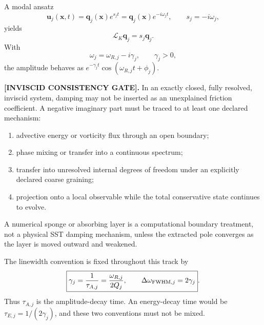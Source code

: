         A modal ansatz
        \begin{equation}
            \mathbf u_j(\mathbf x,t)
            =
            \mathbf q_j(\mathbf x)e^{s_jt}
            =
            \mathbf q_j(\mathbf x)e^{-i\omega_jt},
            \qquad
            s_j=-i\omega_j,
        \end{equation}
        yields
        \begin{equation}
            \mathcal L_K\mathbf q_j
            =
            s_j\mathbf q_j.
            \label{eq:rt_qss_eigenproblem}
        \end{equation}
        With
        \begin{equation}
            \omega_j
            =
            \omega_{R,j}-i\gamma_j,
            \qquad
            \gamma_j>0,
        \end{equation}
        the amplitude behaves as
        \(e^{-\gamma_jt}\cos(\omega_{R,j}t+\phi_j)\).

        \textbf{[INVISCID CONSISTENCY GATE].}
        In an exactly closed, fully resolved, inviscid system, damping may not be
        inserted as an unexplained friction coefficient.  A negative imaginary part
        must be traced to at least one declared mechanism:
        \begin{enumerate}
            \item advective energy or vorticity flux through an open boundary;
            \item phase mixing or transfer into a continuous spectrum;
            \item transfer into unresolved internal degrees of freedom under an
            explicitly declared coarse graining;
            \item projection onto a local observable while the total conservative
            state continues to evolve.
        \end{enumerate}
        A numerical sponge or absorbing layer is a computational boundary treatment,
        not a physical SST damping mechanism, unless the extracted pole converges as
        the layer is moved outward and weakened.

        The linewidth convention is fixed throughout this track by
        \begin{equation}
            \boxed{
                \gamma_j
                =
                \frac{1}{\tau_{A,j}}
                =
                \frac{\omega_{R,j}}{2Q_j},
                \qquad
                \Delta\omega_{{\rm FWHM},j}=2\gamma_j
            }.
            \label{eq:rt_qss_linewidth_convention}
        \end{equation}
        Thus \(\tau_{A,j}\) is the amplitude-decay time.  An energy-decay time would be
        \(\tau_{E,j}=1/(2\gamma_j)\), and these two conventions must not be mixed.

